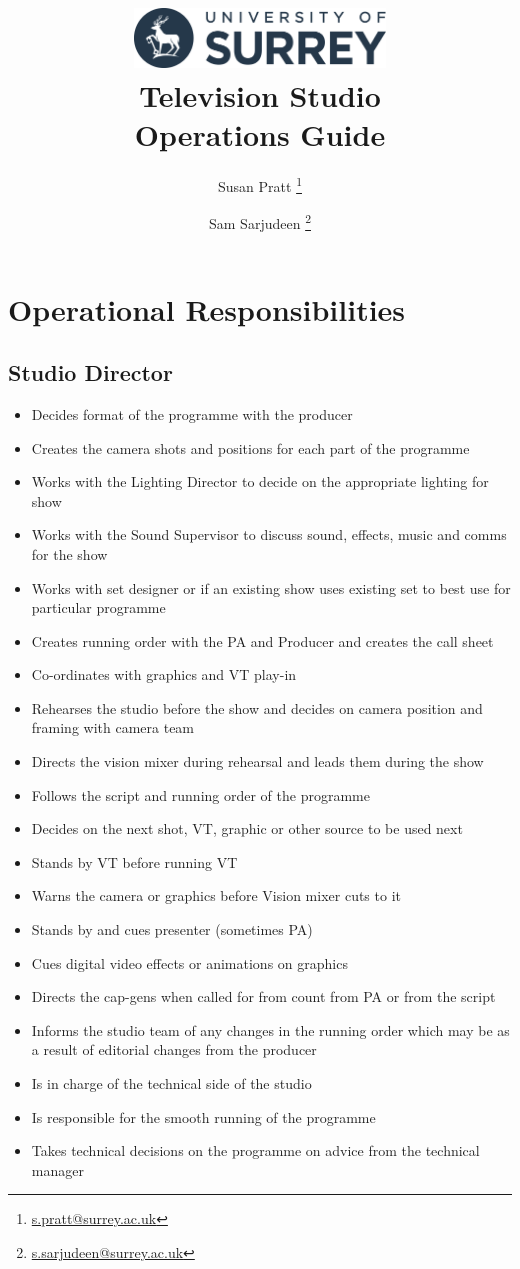 \documentclass[7pt,a5paper]{book}
\title{
\includegraphics[width=0.5\textwidth]{../uos-logo.png}\\
Television Studio\\Operations Guide
}
\author{Susan Pratt \thanks{\href{mailto:s.pratt@surrey.ac.uk}{s.pratt@surrey.ac.uk}} \and Sam Sarjudeen \thanks{\href{mailto:s.sarjudeen@surrey.ac.uk}{s.sarjudeen@surrey.ac.uk}}}
\begin{document}
\maketitle

\chapter{Operational Responsibilities}

\newpage
\section{Studio Director}
% 
\begin{itemize}
    \item Decides format of the programme with the producer
    \item Creates the camera shots and positions for each part of the programme
    \item Works with the Lighting Director to decide on the appropriate lighting for show
    \item Works with the Sound Supervisor to discuss sound, effects, music and comms for the show
    \item Works with set designer or if an existing show uses existing set to best use for particular programme
    \item Creates running order with the PA and Producer and creates the call sheet
    \item Co-ordinates with graphics and VT play-in
    \item Rehearses the studio before the show and decides on camera position and framing with camera team
    \item Directs the vision mixer during rehearsal and leads them during the show
    \item Follows the script and running order of the programme
    \item Decides on the next shot, VT, graphic or other source to be used next
    \item Stands by VT before running VT
    \item Warns the camera or graphics before Vision mixer cuts to it
    \item Stands by and cues presenter (sometimes PA)
    \item Cues digital video effects or animations on graphics
    \item Directs the cap-gens when called for from count from PA or from the script
    \item Informs the studio team of any changes in the running order which may be as a result of editorial changes from the producer
    \item Is in charge of the technical side of the studio
    \item Is responsible for the smooth running of the programme
    \item Takes technical decisions on the programme on advice from the technical manager
\end{itemize}
\end{document}
